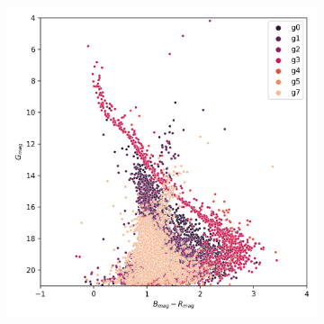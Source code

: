 \documentclass[11pt,a4paper,english,twocolumn]{article}
\begin{document}
\begin{figure}[!hbt]
\begin{subfigure}{0.3\textwidth}
  \end{subfigure}
  \begin{subfigure}{0.3\textwidth}
    \includegraphics[width=\textwidth]{../figures/ngc_2516/dec_hr_diagram_filtered_ngc_2516.png}
  \end{subfigure}


\end{figure}
\end{document}

